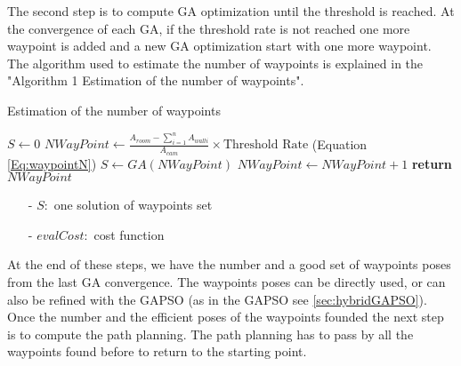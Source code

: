 The second step is to compute GA optimization until the threshold is reached. At the convergence of each GA, if the threshold rate is not reached one more waypoint is added and a new GA optimization start with one more waypoint. The algorithm used to estimate the number of waypoints is explained in the "Algorithm 1 Estimation of the number of waypoints".  \\
\begin{algorithm}{}
\caption{Estimation of the number of waypoints}\label{alg:euclid}
\begin{algorithmic}[6]
 \State $S\gets 0$
  \State $NWayPoint\gets \frac{ A_{room} - \sum_{i=1}^n A_{wall i} }{A_{cam}} \times \mbox{Threshold Rate} 
 $  (Equation \ref{Eq:waypointN})
	 \State $S \gets GA(NWayPoint)$
	  \State $NWayPoint\gets NWayPoint+1$
  \EndWhile\label{endwhile}
\State \textbf{return} $NWayPoint$
\EndProcedure
\end{algorithmic}
\end{algorithm}
\begin{itemize}
\item[-] $S:$ one solution of waypoints set 
\item[-] $evalCost:$ cost function  
\end{itemize}
At the end of these steps, we have the number and a good set of waypoints poses from the last GA convergence. The waypoints poses can be directly used, or can also be refined with the GAPSO (as in the GAPSO see \ref{sec:hybridGAPSO}). Once the number and the efficient poses of the waypoints founded the next step is to compute the path planning. The path planning has to pass by all the waypoints found before to return to the starting point.  
	
 
